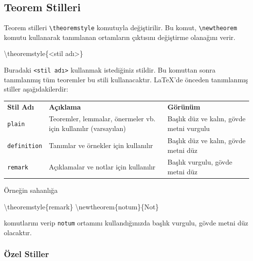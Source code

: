 \documentclass[
  10pt,
]{scrbook}
\newenvironment{Shaded}{\begin{snugshade}}{\end{snugshade}}
\newcommand{\FunctionTok}[1]{\textcolor[rgb]{0.00,0.00,0.00}{#1}}
\newcommand{\NormalTok}[1]{#1}
\theoremstyle{definition}
\theoremstyle{definition}
\theoremstyle{definition}
\theoremstyle{definition}
\theoremstyle{remark}
\begin{document}
\hypertarget{teorem-stilleri}{%
\subsection{Teorem Stilleri}\label{teorem-stilleri}}

Teorem stilleri \texttt{\textbackslash{}theoremstyle} komutuyla değiştirilir. Bu komut,
\texttt{\textbackslash{}newtheorem} komutu kullanarak tanımlanan ortamların çıktısını
değiştirme olanağını verir.

\begin{Shaded}
\begin{Highlighting}[]
\FunctionTok{\textbackslash{}theoremstyle}\NormalTok{\{\textless{}stil adı\textgreater{}\}}
\end{Highlighting}
\end{Shaded}

Buradaki \texttt{\textless{}stil\ adı\textgreater{}} kullanmak istediğiniz stildir. Bu komuttan sonra
tanımlanmış tüm teoremler bu stili kullanacaktır. LaTeX'de önceden
tanımlanmış stiller aşağıdakilerdir:

\begin{longtable}[]{@{}lll@{}}
\toprule
\endhead
\textbf{Stil Adı} & \textbf{Açıklama} & \textbf{Görünüm} \\
\texttt{plain} & Teoremler, lemmalar, önermeler vb. için kullanılır (varsayılan) & Başlık düz ve kalın, gövde metni vurgulu \\
\texttt{definition} & Tanımlar ve örnekler için kullanılır & Başlık düz ve kalın, gövde metni düz \\
\texttt{remark} & Açıklamalar ve notlar için kullanılır & Başlık vurgulu, gövde metni düz \\
\bottomrule
\end{longtable}

Örneğin sahanlığa

\begin{Shaded}
\begin{Highlighting}[]
\FunctionTok{\textbackslash{}theoremstyle}\NormalTok{\{remark\}}
\FunctionTok{\textbackslash{}newtheorem}\NormalTok{\{notum\}\{Not\}}
\end{Highlighting}
\end{Shaded}

komutlarını verip \texttt{notum} ortamını kullandığınızda başlık vurgulu, gövde metni düz olacaktır.

\hypertarget{uxf6zel-stiller}{%
\subsubsection{Özel Stiller}\label{uxf6zel-stiller}}
\end{document}
